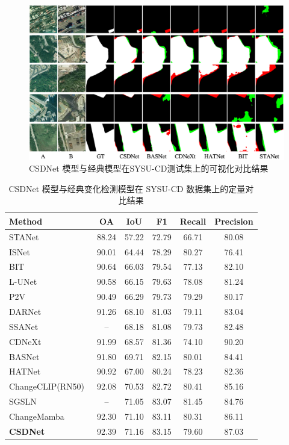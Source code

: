 \begin{figure}[!htb]
	\centering
	\includegraphics[width=\textwidth]{paper_figures/基于双时相遥感影像风格解缠和内容细化增强遥感变化检测方法/csdnet_sysu.png}
	\caption{CSDNet 模型与经典模型在SYSU-CD测试集上的可视化对比结果}
	\label{fig:csdnet_sysu}
\end{figure}

\begin{table}[!htb]
\centering
\caption{CSDNet 模型与经典变化检测模型在 SYSU-CD 数据集上的定量对比结果}
\label{tab:csdnet_sysu}
\begin{tabular}{l c c c c c}
\toprule
Method & OA & IoU & F1 & Recall & Precision \\
\midrule
STANet~\cite{chen_spatial-temporal_2020} & 88.24 & 57.22 & 72.79 & 66.71 & 80.08 \\
ISNet~\cite{Cheng2022ISNetTI} & 90.01 & 64.44 & 78.29 & 80.27 & 76.41 \\
BIT~\cite{chen_remote_2022} & 90.64 & 66.03 & 79.54 & 77.13 & 82.10 \\
L-UNet~\cite{Papadomanolaki2021ADM} & 90.58 & 66.15 & 79.63 & 78.08 & 81.24 \\
P2V~\cite{lin_transition_2023} & 90.49 & 66.29 & 79.73 & 79.29 & 80.17 \\
DARNet~\cite{li_densely_2022} & 91.26 & 68.10 & 81.03 & 79.11 & 83.04 \\
SSANet~\cite{Jiang2022JointVL} & -- & 68.18 & 81.08 & 79.73 & 82.48 \\
CDNeXt~\cite{wei_robust_2024} & 91.99 & 68.57 & 81.36 & 74.10 & 90.20 \\
BASNet~\cite{z_wang_bitemporal_2024} & 91.80 & 69.71 & 82.15 & 80.01 & 84.41 \\
HATNet~\cite{Xu2024HybridAT} & 90.92 & 67.00 & 80.24 & 78.23 & 82.36 \\
ChangeCLIP(RN50)~\cite{dong2024changeclip} & 92.08 & 70.53 & 82.72 & 80.41 & 85.16 \\
SGSLN~\cite{zhao_exchanging_2023} & -- & 71.05 & 83.07 & 81.45 & 84.76 \\
ChangeMamba~\cite{chen2024changemamba} & 92.30 & 71.10 & 83.11 & 80.31 & 86.11 \\
\textbf{CSDNet} & 92.39 & 71.16 & 83.15 & 79.60 & 87.03 \\
\bottomrule
\end{tabular}%
\end{table}


